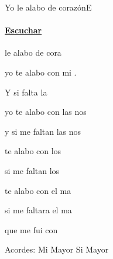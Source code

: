 \documentclass[12pt, spanish]{book}
\begin{document}
    \begin{song}{Yo le alabo de corazón}{E}
        {} %
        {}
        {} %
        {}
        \ifChordBk
            \paragraph{\mbox{}\hfill\protect\href{https://open.spotify.com/intl-es/track/62r9PprYRCmASYjS1j2671}{Escuchar}\mbox{}\hfill}
        \fi

        \begin{SBOpGroup}
             le alabo de cora

            yo te alabo con mi .
        \end{SBOpGroup}

        \begin{SBOpGroup}
            Y si  falta la 

            yo te alabo con las nos

            y si me faltan las nos

             te alabo con los 

             si me faltan los 

             te alabo con el ma

             si me faltara el ma

             que  me fui con 
        \end{SBOpGroup}

        \ifChordBk
        \begin{SBOpGroup}
            Acordes:
            \upchord{\E}\qquad Mi Mayor \hfill
            \upchord{\B}\qquad Si Mayor \hfill\null\break
        \end{SBOpGroup}
        \fi
    \end{song}
\end{document}
